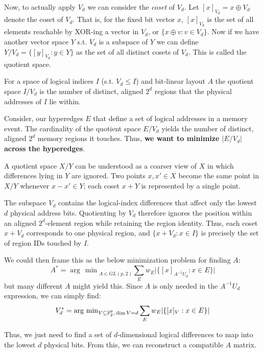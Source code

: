 \documentclass[10pt]{article}
\theoremstyle{remark}
\begin{document}
Now, to actually apply $V_d$ we can consider the \emph{coset} of $V_d$.
Let $[x]_{V_d} = x\oplus V_d$ denote the coset of $V_d$. That is, for the fixed bit vector $x$, $[x]_{V_d}$ is the set of all elements reachable by XOR-ing a vector in $V_d$, or $\{x\oplus v : v \in V_d\}$. Now if we have another vector space $Y$ s.t. $V_d$ is a subspace of $Y$ we can define $Y/V_d = \{[y]_{V_d} : y \in Y\}$ as the set of all distinct cosets of $V_d$. This is called the quotient space.

\begin{highlight}
    For a space of logical indices $I$ (s.t. $V_d \le I$) and bit-linear layout $A$ the quotient space $I/V_d$ is the number of distinct, aligned $2^d$ regions that the physical addresses of $I$ lie within.
\end{highlight}

Consider, our hyperedges $E$ that define a set of logical addresses in a memory event. The cardinality of the quotient space $E/V_d$ yields the number of distinct, aligned $2^d$ memory regions it touches. Thus, \textbf{we want to minimize $\lvert E/V_d \rvert$ across the hyperedges}.

\begin{motivation}
    A quotient space $X/Y$ can be understood as a coarser view of $X$ in which differences lying in $Y$ are ignored. Two points $x,x'\in X$ become the same point in $X/Y$ whenever $x-x'\in Y$; each coset $x+Y$ is represented by a single point.
    
    The subspace $V_d$ contains the logical-index differences that affect only the lowest $d$ physical address bits. Quotienting by $V_d$ therefore ignores the position within an aligned $2^d$-element region while retaining the region identity. Thus, each coset $x+V_d$ corresponds to one physical region, and $\{x+V_d : x\in I\}$ is precisely the set of region IDs touched by $I$.
\end{motivation}

We could then frame this as the below minimization problem for finding $A$:
%
\[
A^* = {\arg\,\min}_{A\in GL(p,2)} \sum_E w_E \lvert \{[x]_{A^{-1}U_d} : x \in E \} \rvert
\]
%
but many different $A$ might yield this. Since $A$ is only needed in the $A^{-1} U_d$ expression, we can simply find:
%
\[
V_{d}^* = {\arg\,\min}_{V\subseteq \mathbb{F}_2^p, \\ \dim V = d}
    \sum_E w_E \lvert \{ [x]_V : x \in E \} \rvert
\]

Thus, we just need to find a set of $d$-dimensional logical differences to map into the lowest $d$ physical bits. From this, we can reconstruct a compatible $A$ matrix.
\end{document}
